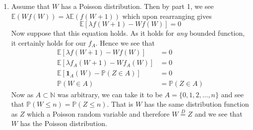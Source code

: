 \documentclass[12pt]{article}  %
\newcommand{\N}{{\mathbb{N}}}
\newcommand{\E}{{\mathbb{E}}}
\newcommand{\prob}{{\mathbb{P}}}
\newcommand{\ind}{{\mathbf{1}}}
\begin{document}
\begin{enumerate}
\begin{enumerate}
\item Assume that $W$ has a Poisson distribution. Then by part 1, we see $\E(Wf(W)) = \lambda\E(f(W+1))$ which upon rearranging gives $$\E\left[\lambda f(W+1)-Wf(W)\right] = 0$$ Now suppose that this equation holds. As it holds for \textit{any} bounded function, it certainly holds for our $f_A$. Hence we see that 
\begin{align*}
	\E\left[\lambda f(W+1)-Wf(W)\right] &= 0\\
	\E\left[\lambda f_A(W+1)-Wf_A(W)\right] &= 0\\
	\E\left[\ind_{A}(W) - \prob(Z\in A)\right] &= 0\\
	\prob(W\in A) &= \prob(Z\in A)
\end{align*}
Now as $A\subset\N$ was arbitrary, we can take it to be $A = \{0,1,2,\ldots, n\}$ and see that $\prob(W\leq n) = \prob(Z\leq n)$. That is $W$ has the same distribution function as $Z$ which a Poisson random variable and therefore $W\overset{D}{=}Z$ and we see that $W$ has the Poisson distribution.


\end{enumerate}
\end{enumerate}
\end{document}

